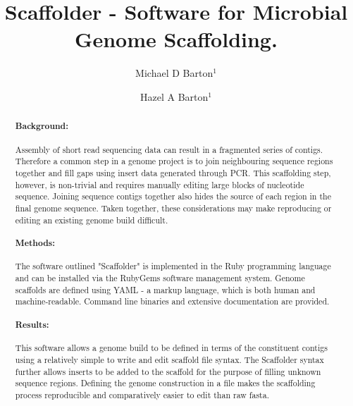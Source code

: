 \documentclass[10pt]{bmc_article}
\newenvironment{bmcformat}{\begin{raggedright}\baselineskip20pt\sloppy\setboolean{publ}{false}}{\end{raggedright}\baselineskip20pt\sloppy}
\begin{document}
\begin{bmcformat}

\title{Scaffolder - Software for Microbial Genome Scaffolding.}

\author{
  Michael D Barton$^{1}$%
\and
  Hazel A Barton\correspondingauthor$^1$%
      }

\address{\iid(1) Department of Biological Sciences, Northern Kentucky%
University, Nunn Drive, Highland Heights, KY 41076 }%

\maketitle

\begin{abstract}

  \paragraph*{Background:} Assembly of short read sequencing data can result in
  a fragmented series of contigs. Therefore a common step in a genome project
  is to join neighbouring sequence regions together and fill gaps using insert
  data generated through PCR. This scaffolding step, however, is non-trivial
  and requires manually editing large blocks of nucleotide sequence. Joining
  sequence contigs together also hides the source of each region in the final
  genome sequence. Taken together, these considerations may make reproducing or
  editing an existing genome build difficult.

  \paragraph*{Methods:} The software outlined "Scaffolder" is implemented in
  the Ruby programming language and can be installed via the RubyGems software
  management system. Genome scaffolds are defined using YAML - a markup
  language, which is both human and machine-readable. Command line binaries and
  extensive documentation are provided.

  \paragraph*{Results:} This software allows a genome build to be defined in
  terms of the constituent contigs using a relatively simple to write and edit
  scaffold file syntax. The Scaffolder syntax further allows inserts to be
  added to the scaffold for the purpose of filling unknown sequence regions.
  Defining the genome construction in a file makes the scaffolding process
  reproducible and comparatively easier to edit than raw fasta.


\end{abstract}
\end{bmcformat}
\end{document}
